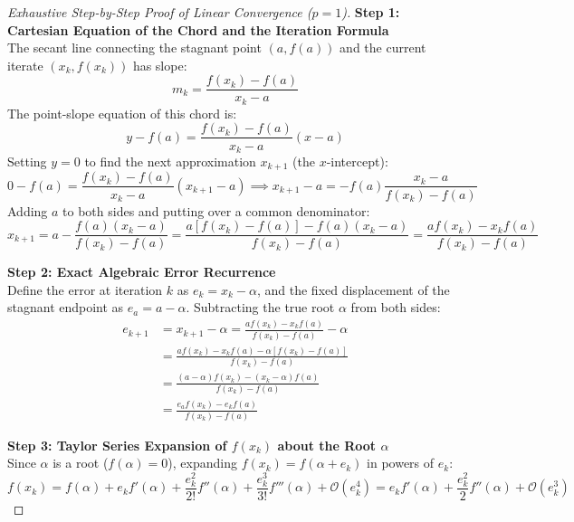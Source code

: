 \begin{proof}[Exhaustive Step-by-Step Proof of Linear Convergence ($p = 1$)]
\noindent\textbf{Step 1: Cartesian Equation of the Chord and the Iteration Formula} \\
The secant line connecting the stagnant point $(a, f(a))$ and the current iterate $(x_k, f(x_k))$ has slope:
\begin{equation}
    m_k = \frac{f(x_k) - f(a)}{x_k - a}
\end{equation}
The point-slope equation of this chord is:
\begin{equation}
    y - f(a) = \frac{f(x_k) - f(a)}{x_k - a}(x - a)
\end{equation}
Setting $y = 0$ to find the next approximation $x_{k+1}$ (the $x$-intercept):
\begin{equation}
    0 - f(a) = \frac{f(x_k) - f(a)}{x_k - a}(x_{k+1} - a) \implies x_{k+1} - a = -f(a) \frac{x_k - a}{f(x_k) - f(a)}
\end{equation}
Adding $a$ to both sides and putting over a common denominator:
\begin{equation}
    x_{k+1} = a - \frac{f(a)(x_k - a)}{f(x_k) - f(a)} = \frac{a[f(x_k) - f(a)] - f(a)(x_k - a)}{f(x_k) - f(a)} = \frac{a f(x_k) - x_k f(a)}{f(x_k) - f(a)}
\end{equation}

\noindent\textbf{Step 2: Exact Algebraic Error Recurrence} \\
Define the error at iteration $k$ as $e_k = x_k - \alpha$, and the fixed displacement of the stagnant endpoint as $e_a = a - \alpha$. Subtracting the true root $\alpha$ from both sides:
\begin{align}
    e_{k+1} &= x_{k+1} - \alpha = \frac{a f(x_k) - x_k f(a)}{f(x_k) - f(a)} - \alpha \nonumber \\
    &= \frac{a f(x_k) - x_k f(a) - \alpha[f(x_k) - f(a)]}{f(x_k) - f(a)} \nonumber \\
    &= \frac{(a - \alpha) f(x_k) - (x_k - \alpha) f(a)}{f(x_k) - f(a)} \nonumber \\
    &= \frac{e_a f(x_k) - e_k f(a)}{f(x_k) - f(a)}
    \label{eq:regula_exact_error_ratio}
\end{align}

\noindent\textbf{Step 3: Taylor Series Expansion of $f(x_k)$ about the Root $\alpha$} \\
Since $\alpha$ is a root ($f(\alpha) = 0$), expanding $f(x_k) = f(\alpha + e_k)$ in powers of $e_k$:
\begin{equation}
    f(x_k) = f(\alpha) + e_k f'(\alpha) + \frac{e_k^2}{2!} f''(\alpha) + \frac{e_k^3}{3!} f'''(\alpha) + \mathcal{O}(e_k^4) = e_k f'(\alpha) + \frac{e_k^2}{2} f''(\alpha) + \mathcal{O}(e_k^3)
\end{equation}


\end{proof}
